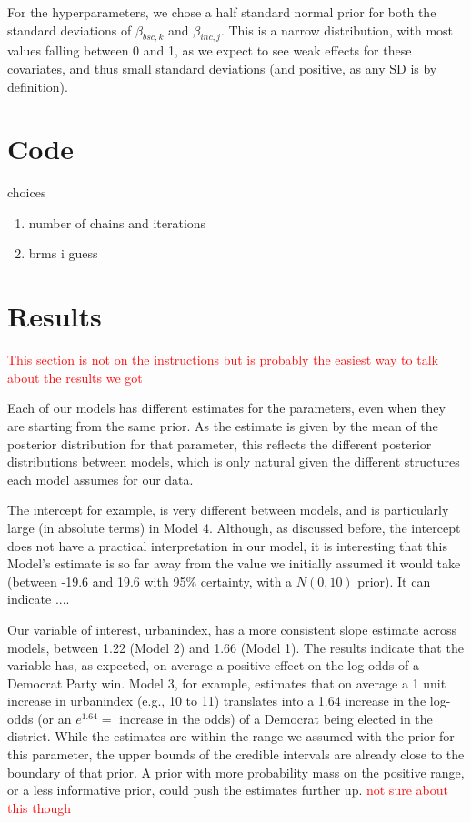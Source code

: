 \documentclass[12pt]{article}
\newcommand{\red}[1]{\textcolor{red}{#1}}
\begin{document}
For the hyperparameters, we chose a half standard normal prior for both the standard deviations of $\beta_{bsc,k}$ and $\beta_{inc,j}$. This is a narrow distribution, with most values falling between 0 and 1, as we expect to see weak effects for these covariates, and thus small standard deviations (and positive, as any SD is by definition).









\section{Code}

choices
\begin{enumerate}
	\item number of chains and iterations
	\item brms i guess
\end{enumerate}

\section{Results}

\textcolor{red}{This section is not on the instructions but is probably the easiest way to talk about the results we got }


Each of our models has different estimates for the parameters, even when they are starting from the same prior.
As the estimate is given by the mean of the posterior distribution for that parameter, this reflects the different posterior distributions between models, which is only natural given the different structures each model assumes for our data.

The intercept for example, is very different between models, and is particularly large (in absolute terms) in Model 4. Although, as discussed before, the intercept does not have a practical interpretation in our model, it is interesting that this Model's estimate is so far away from the value we initially assumed it would take (between -19.6 and 19.6 with 95\% certainty, with a $N(0,10)$ prior). It can indicate ....

Our variable of interest, urbanindex, has a more consistent slope estimate across models, between 1.22 (Model 2) and 1.66 (Model 1). The results indicate that the variable has, as expected, on average a positive effect on the log-odds of a Democrat Party win.
Model 3, for example, estimates that on average a 1 unit increase in urbanindex (e.g., 10 to 11) translates into a 1.64 increase in the log-odds (or an $e^{1.64} = $ increase in the odds) of a Democrat being elected in the district.
While the estimates are within the range we assumed with the prior for this parameter, the upper bounds of the credible intervals are already close to the boundary of that prior. 
A prior with more probability mass on the positive range, or a less informative prior, could push the estimates further up. \red{not sure about this though}
\end{document}
